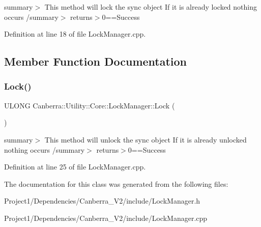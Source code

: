 summary$>$ This method will lock the sync object If it is already locked nothing occurs /summary$>$ returns$>$0==Success

Definition at line 18 of file Lock\+Manager.\+cpp.



\subsection{Member Function Documentation}
\mbox{\label{class_canberra_1_1_utility_1_1_core_1_1_lock_manager_aa3843447f5eac5a89d2132966db671b5_aa3843447f5eac5a89d2132966db671b5}} 
\subsubsection{\texorpdfstring{Lock()}{Lock()}}
{\footnotesize\ttfamily U\+L\+O\+NG Canberra\+::\+Utility\+::\+Core\+::\+Lock\+Manager\+::\+Lock (\begin{DoxyParamCaption}{ }\end{DoxyParamCaption})}

summary$>$ This method will unlock the sync object If it is already unlocked nothing occurs /summary$>$ returns$>$0==Success

Definition at line 25 of file Lock\+Manager.\+cpp.



The documentation for this class was generated from the following files\+:\begin{DoxyCompactItemize}
\item 
Project1/\+Dependencies/\+Canberra\+\_\+\+V2/include/Lock\+Manager.\+h\item 
Project1/\+Dependencies/\+Canberra\+\_\+\+V2/include/Lock\+Manager.\+cpp\end{DoxyCompactItemize}
